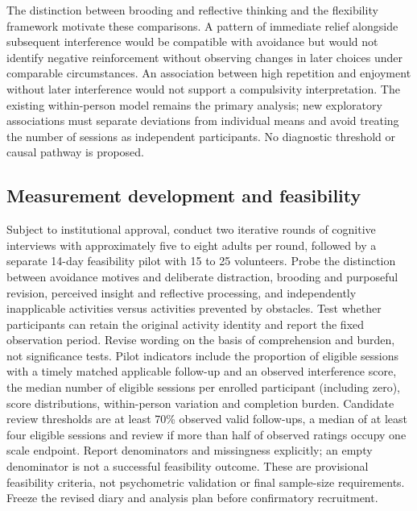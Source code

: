 \documentclass[11pt]{article}
\begin{document}
The distinction between brooding and reflective thinking \citep{treynor2003,watkins2008} and the flexibility framework \citep{bonanno2013} motivate these comparisons. A pattern of immediate relief alongside subsequent interference would be compatible with avoidance but would not identify negative reinforcement without observing changes in later choices under comparable circumstances. An association between high repetition and enjoyment without later interference would not support a compulsivity interpretation. The existing within-person model remains the primary analysis; new exploratory associations must separate deviations from individual means and avoid treating the number of sessions as independent participants. No diagnostic threshold or causal pathway is proposed.

\subsection{Measurement development and feasibility}
Subject to institutional approval, conduct two iterative rounds of cognitive interviews with approximately five to eight adults per round, followed by a separate 14-day feasibility pilot with 15 to 25 volunteers. Probe the distinction between avoidance motives and deliberate distraction, brooding and purposeful revision, perceived insight and reflective processing, and independently inapplicable activities versus activities prevented by obstacles. Test whether participants can retain the original activity identity and report the fixed observation period. Revise wording on the basis of comprehension and burden, not significance tests. Pilot indicators include the proportion of eligible sessions with a timely matched applicable follow-up and an observed interference score, the median number of eligible sessions per enrolled participant (including zero), score distributions, within-person variation and completion burden. Candidate review thresholds are at least 70\% observed valid follow-ups, a median of at least four eligible sessions and review if more than half of observed ratings occupy one scale endpoint. Report denominators and missingness explicitly; an empty denominator is not a successful feasibility outcome. These are provisional feasibility criteria, not psychometric validation or final sample-size requirements. Freeze the revised diary and analysis plan before confirmatory recruitment.
\end{document}
